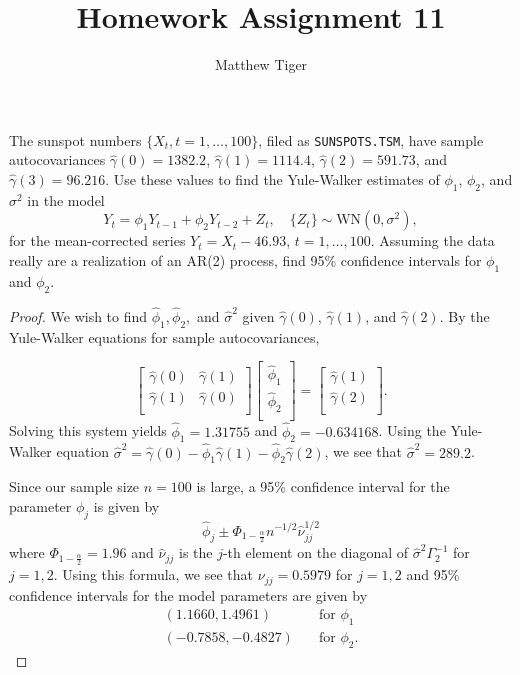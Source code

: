 \documentclass[12pt]{article}
\title{Homework Assignment 11}
\author{Matthew Tiger}
\theoremstyle{definition}
\newenvironment{custompbm}[1]
  {\renewcommand\theproblem{#1}\problem}
  {\endproblem}
\begin{document}
\maketitle


\begin{custompbm}{5.1}
  The sunspot numbers $\{X_t, t=1,\dots, 100\}$, filed as \texttt{SUNSPOTS.TSM},
  have sample autocovariances $\hat{\gamma}(0) = 1382.2$, $\hat{\gamma}(1) = 1114.4$,
  $\hat{\gamma}(2) = 591.73$, and $\hat{\gamma}(3) = 96.216$. Use these values to
  find the Yule-Walker estimates of $\phi_1$, $\phi_2$, and $\sigma^2$ in the model
  \[
    Y_t = \phi_1 Y_{t-1} + \phi_2 Y_{t-2} + Z_t, \quad \{Z_t\} \sim \text{WN}(0, \sigma^2),
  \]
  for the mean-corrected series $Y_t = X_t - 46.93$, $t=1,\dots, 100$. Assuming the
  data really are a realization of an AR(2) process, find 95\% confidence intervals
  for $\phi_1$ and $\phi_2$.
\end{custompbm}

\begin{proof}
  We wish to find $\hat{\phi}_1, \hat{\phi}_2,$ and $\hat{\sigma}^2$ given $\hat{\gamma}(0)$,
  $\hat{\gamma}(1)$, and $\hat{\gamma}(2)$. By the Yule-Walker equations for sample
  autocovariances,

  \[
    \begin{bmatrix}
      \hat{\gamma}(0) & \hat{\gamma}(1) \\
      \hat{\gamma}(1) & \hat{\gamma}(0) \\
    \end{bmatrix}
    \begin{bmatrix}
      \hat{\phi}_1 \\
      \hat{\phi}_2 \\
    \end{bmatrix}
    =
    \begin{bmatrix}
      \hat{\gamma}(1) \\
      \hat{\gamma}(2) \\
    \end{bmatrix}.
  \]
  Solving this system yields $\hat{\phi}_1 = 1.31755$ and $\hat{\phi}_2 = -0.634168$.
  Using the Yule-Walker equation $\hat{\sigma}^2 = \hat{\gamma}(0) - \hat{\phi}_1 \hat{\gamma}(1) - \hat{\phi}_2 \hat{\gamma}(2)$,
  we see that $\hat{\sigma}^2 = 289.2$.

  Since our sample size $n=100$ is large, a 95\% confidence interval for the parameter $\phi_j$ is given by
  \[
   \hat{\phi}_j \pm \Phi_{1-\frac{\alpha}{2}}n ^{-1/2} \hat{\nu}_{jj}^{1/2}
  \]
  where $\Phi_{1-\frac{\alpha}{2}} = 1.96$ and $\hat{\nu}_{jj}$ is the $j$-th element on the diagonal of
  $\hat{\sigma}^2\Gamma_2^{-1}$ for $j=1,2$. Using this formula, we see that
  $\nu_{jj} = 0.5979$ for $j=1,2$ and 95\% confidence intervals for the model
  parameters are given by
  \begin{align*}
    (1.1660, 1.4961)& \quad \text{for $\phi_1$} \\
    (-0.7858, -0.4827)& \quad \text{for $\phi_2$} .
  \end{align*}
\end{proof}
\end{document}
